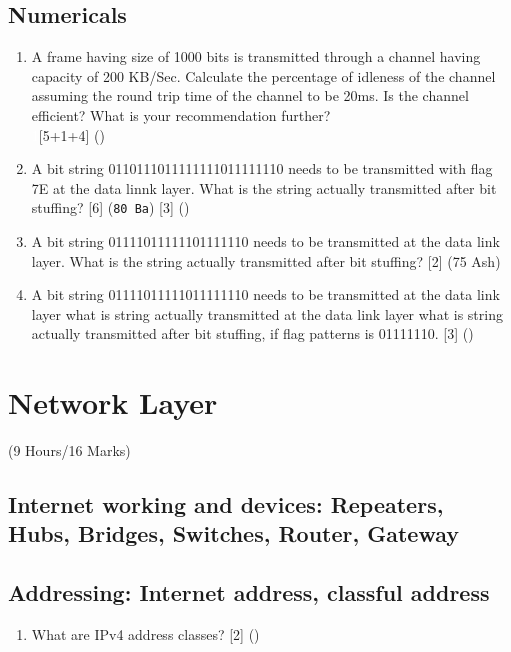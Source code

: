 \documentclass[12pt]{article}
\newcommand{\enter}{\\\textcolor{white}{1}}
\begin{document}
	\subsection{Numericals}
		\begin{enumerate}[noitemsep, topsep=0pt]
			\item A frame having size of 1000 bits is transmitted through a channel having capacity of 200 KB/Sec. Calculate the percentage of idleness of the channel assuming the round trip time of the channel to be 20ms. Is the channel efficient? What is your recommendation further?
			\enter\hfill [5+1+4] () 

			\item A bit string 0110111011111111011111110 needs to be transmitted with flag 7E at the data linnk layer. What is the string actually transmitted after bit stuffing? \hfill [6] (\texttt{80 Ba}) [3] ()

			\item A bit string 01111011111101111110 needs to be transmitted at the data link layer. What is the string actually transmitted after bit stuffing? \hfill [2] (75 Ash)

			\item A bit string 01111011111011111110 needs to be transmitted at the data link layer what is string actually transmitted at the data  link layer what is string actually transmitted after bit stuffing, if flag patterns is 01111110. \hfill [3] ()
		\end{enumerate}

	\pagebreak

\section{Network Layer}
	\begin{center}(9 Hours/16 Marks)\end{center}
	\subsection{Internet working and devices: Repeaters, Hubs, Bridges, Switches, Router, Gateway}
	\subsection{Addressing: Internet address, classful address}
		\begin{enumerate}[noitemsep, topsep=0pt]
			\item What are IPv4 address classes? \hfill [2] ()
		\end{enumerate}
\end{document}

